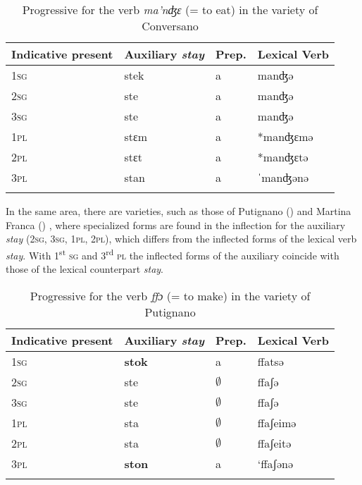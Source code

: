\documentclass[output=paper]{langsci/langscibook}
\begin{document}
\begin{table}
\begin{tabular}{*{4}{l}}
\lsptoprule
Indicative present & Auxiliary \textit{stay} & Prep. & Lexical Verb\\\midrule
\scshape 1sg & stek & a & manʤə\\
\scshape 2sg & ste & a & manʤə\\
\scshape 3sg & ste & a & manʤə\\
\scshape 1pl & stɛm & a & *manʤɛmə\\
\scshape 2pl & stɛt & a & *manʤɛtə\\
\scshape 3pl & stan & a & ˈmanʤənə\\
\lspbottomrule
\end{tabular}
\caption{Progressive for the verb \textit{ma’nʤɛ} (= to eat) in the variety of Conversano\label{tab:lorusso:1}}
\end{table}


In the same area, there are varieties, such as those of Putignano () and Martina Franca () \citep[I:689–690]{Manzini2005}, where specialized forms are found in the inflection for the auxiliary \textit{stay} (\textsc{2sg, 3sg, 1pl, 2pl}), which differs from the inflected forms of the lexical verb \textit{stay}. With 1\textsuperscript{st} \textsc{sg} and 3\textsuperscript{rd} \textsc{pl} the inflected forms of the auxiliary coincide with those of the lexical counterpart \textit{stay}. 

\begin{table}
\begin{tabular}{*{4}{l}}
\lsptoprule
Indicative present & Auxiliary \textit{stay} & Prep. & Lexical Verb\\\midrule
\scshape 1sg & \textbf{stok} & a & ffatsə\\
\scshape 2sg & ste & ${\emptyset}$ & ffaʃə\\
\scshape 3sg & ste & ${\emptyset}$ & ffaʃə\\
\scshape 1pl & sta & ${\emptyset}$ & ffaʃeimə\\
\scshape 2pl & sta & ${\emptyset}$ & ffaʃeitə\\
\scshape 3pl & \textbf{ston} & a & ‘ffaʃənə\\
\lspbottomrule
\end{tabular}
\caption{Progressive for the verb \textit{ffɔ} (= to make) in the variety of Putignano\label{tab:lorusso:2}}
\end{table}
\end{document}
